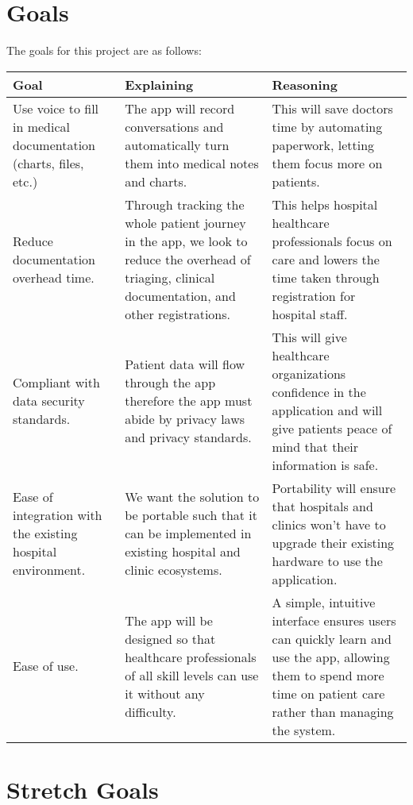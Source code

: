 \documentclass{article}
\begin{document}
\section{Goals}

The goals for this project are as follows:

\begin{table}[H]
    \centering
    \begin{tabular}{p{4cm} p{4cm} p{4cm}}
        \toprule
        \textbf{Goal} & \textbf{Explaining} & \textbf{Reasoning} \\
        \midrule
        Use voice to fill in medical documentation (charts, files, etc.) & The app will record conversations and automatically turn them into medical notes and charts. & This will save doctors time by automating paperwork, letting them focus more on patients. \\
        \midrule
        Reduce documentation overhead time.  & Through tracking the whole patient journey in the app, we look to reduce the overhead of triaging, clinical documentation, and other registrations.  & This helps hospital healthcare professionals focus on care and lowers the time taken through registration for hospital staff. \\ 
        \midrule
        Compliant with data security standards.  & Patient data will flow through the app therefore the app must abide by privacy laws and privacy standards. & This will give healthcare organizations confidence in the application and will give patients peace of mind that their information is safe. \\
        \midrule 
        Ease of integration with the existing hospital environment. & We want the solution to be portable such that it can be implemented in existing hospital and clinic ecosystems.  & Portability will ensure that hospitals and clinics won’t have to upgrade their existing hardware to use the application. \\
        \midrule 
        Ease of use. & The app will be designed so that healthcare professionals of all skill levels can use it without any difficulty. & A simple, intuitive interface ensures users can quickly learn and use the app, allowing them to spend more time on patient care rather than managing the system. \\
        \bottomrule
    \end{tabular}
\end{table}

\section{Stretch Goals}
\end{document}
